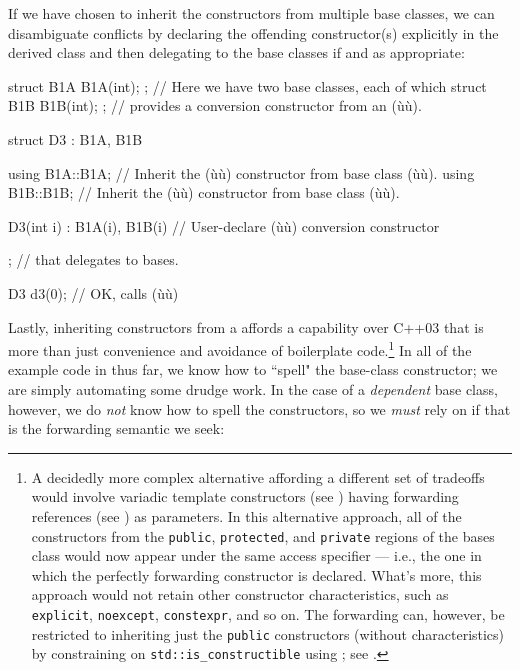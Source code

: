 If we have chosen to inherit the constructors from multiple
base classes, we can disambiguate conflicts by declaring the offending
constructor(s) explicitly in the derived class and then delegating to
the base classes if and as appropriate:

\begin{emcppslisting}
struct B1A { B1A(int); };  // Here we have two base classes, each of which
struct B1B { B1B(int); };  // provides a conversion constructor from an (ù{}ù).

struct D3 : B1A, B1B
{
    using B1A::B1A;  // Inherit the (ù{}ù) constructor from base class (ù{}ù).
    using B1B::B1B;  // Inherit the (ù{}ù) constructor from base class (ù{}ù).

    D3(int i) : B1A(i), B1B(i) { }  // User-declare (ù{}ù) conversion constructor
};                                  // that delegates to bases.

D3 d3(0);  // OK, calls (ù{}ù)
\end{emcppslisting}
    
\noindent Lastly, inheriting constructors from a  affords a capability over C++03 that is more than just convenience
and avoidance of boilerplate code.{\cprotect\footnote{A decidedly more
complex alternative affording a different set of tradeoffs would
  involve variadic template constructors (see ) 
  having
 forwarding references (see ) 
 as parameters. In this
  alternative approach, all of the constructors from the
  \mbox{\lstinline!public!}, \mbox{\lstinline!protected!}, and \mbox{\lstinline!private!} regions of the
  bases class would now appear under the same access specifier --- i.e.,
  the one in which the perfectly forwarding constructor is declared.
  What's more, this approach would not retain other constructor
  characteristics, such as \lstinline!explicit!, \lstinline!noexcept!,
  \lstinline!constexpr!, and so on. The forwarding can, however, be restricted to
  inheriting just the \lstinline!public! constructors (without
  characteristics) by constraining on \lstinline!std::is_constructible!
  using ; see .}} 
  In all of the example code in  
  thus far, we know how to ``spell" the
base-class constructor; we are simply automating some drudge work. In
the case of a \emph{dependent} base class, however, we do \emph{not}
know how to spell the constructors, so we \emph{must} rely on
 if that is the forwarding semantic we
seek:

